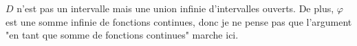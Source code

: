 $D$ n'est pas un intervalle mais une union infinie d'intervalles ouverts.
De plus, $\varphi$ est une somme infinie de fonctions continues, donc je ne pense pas que l'argument "en tant que somme de fonctions continues" marche ici.
